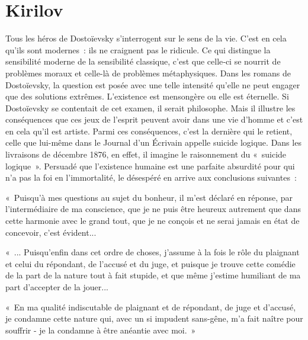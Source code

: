 \documentclass{book}
\begin{document}
\section{Kirilov}

Tous les héros de Dostoïevsky s'interrogent sur le sens de la vie. C'est en cela qu'ils sont modernes : ils ne craignent pas le ridicule. Ce qui distingue la sensibilité moderne de la sensibilité classique, c'est que celle‑ci se nourrit de problèmes moraux et celle-là de problèmes métaphysiques. Dans les romans de Dostoïevsky, la question est posée avec une telle intensité qu'elle ne peut engager que des solutions extrêmes. L'existence est mensongère ou elle est éternelle. Si Dostoïevsky se contentait de cet examen, il serait philosophe. Mais il illustre les conséquences que ces jeux de l'esprit peuvent avoir dans une vie d'homme et c'est en cela qu'il est artiste. Parmi ces conséquences, c'est la dernière qui le retient, celle que lui-même dans le Journal d'un Écrivain appelle suicide logique. Dans les livraisons de décembre 1876, en effet, il imagine le raisonnement du « suicide logique ». Persuadé que l'existence humaine est une parfaite absurdité pour qui n'a pas la foi en l'immortalité, le désespéré en arrive aux conclusions suivantes :

« Puisqu'à mes questions au sujet du bonheur, il m'est déclaré en réponse, par l'intermédiaire de ma conscience, que je ne puis être heureux autrement que dans cette harmonie avec le grand tout, que je ne conçois et ne serai jamais en état de concevoir, c'est évident...

« ... Puisqu'enfin dans cet ordre de choses, j'assume à la fois le rôle du plaignant et celui du répondant, de l'accusé et du juge, et puisque je trouve cette comédie de la part de la nature tout à fait stupide, et que même j'estime humiliant de ma part d'accepter de la jouer...

« En ma qualité indiscutable de plaignant et de répondant, de juge et d'accusé, je condamne cette nature qui, avec un si impudent sans-gêne, m'a fait naître pour souffrir - je la condamne à être anéantie avec moi. »
\end{document}
